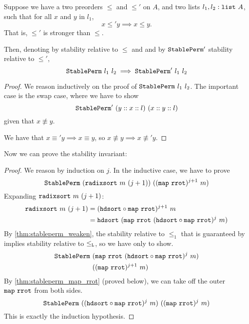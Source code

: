 \documentclass[sigplan,10pt,anonymous,review]{thesis}
\begin{document}
\begin{theorem}
  \label{thm:stableperm_weaken}
  Suppose we have a two preorders $\le$ and $\le'$ on $A$, and two lists
  $l_1,l_2 : \texttt{\textup{list}}~A$, such that for all $x$ and $y$ in $l_1$,
  \begin{equation*}
    x \le' y \implies x \le y.
  \end{equation*}
  That is, $\le'$ is stronger than $\le$.

  Then, denoting by  stability relative to $\le$ and and
  by $\texttt{\textup{StablePerm}}'$ stability relative to $\le'$,
  \begin{equation*}
    \texttt{\textup{StablePerm}}~l_1~l_2 \implies \texttt{\textup{StablePerm}}'~l_1~l_2
  \end{equation*}
\end{theorem}
\begin{proof}
  We reason inductively on the proof of $\texttt{\textup{StablePerm}}~l_1~l_2$.
  The important case is the swap case, where we have to show
  \begin{equation*}
    \texttt{\textup{StablePerm}}'~(y :: x :: l)~(x :: y :: l)
  \end{equation*}
  given that $x \not\equiv y$.

  We have that $x \equiv' y \implies x \equiv y$, so $x \not\equiv y \implies x
  \not\equiv' y$.
\end{proof}

Now we can prove the stability invariant:
\radixsortstableinv*
\begin{proof}
  We reason by induction on $j$. In the inductive case, we have to prove
  \begin{equation*}
    \texttt{\textup{StablePerm}}~(\texttt{\textup{radixsort}}~m~(j+1))~((\texttt{\textup{map}}~\texttt{\textup{rrot}})^{j+1}~m)
  \end{equation*}
  Expanding $\texttt{\textup{radixsort}}~m~(j+1)$:
  \begin{align*}
     \texttt{\textup{radixsort}}~m~(j+1)
    ={}& (\texttt{\textup{hdsort}} \circ \texttt{\textup{map}}~\texttt{\textup{rrot}})^{j+1}~m \\
    ={}& \texttt{\textup{hdsort}}~(\texttt{\textup{map}}~\texttt{\textup{rrot}}~(\texttt{\textup{hdsort}} \circ \texttt{\textup{map}}~\texttt{\textup{rrot}})^j~m)
  \end{align*}
  By \cref{thm:stableperm_weaken}, the stability relative to $\le_1$
  that is guaranteed by  implies stability relative to
  $\le_{\texttt{\textup{L}}}$, so we have only to show.
  \begin{align*}
    \texttt{\textup{StablePerm}}~&(\texttt{\textup{map}}~\texttt{\textup{rrot}}~(\texttt{\textup{hdsort}} \circ \texttt{\textup{map}}~\texttt{\textup{rrot}})^j~m) \\
                     &((\texttt{\textup{map}}~\texttt{\textup{rrot}})^{j+1}~m)
  \end{align*}
  By \cref{thm:stableperm_map_rrot} (proved below), we can take off
  the outer $\texttt{\textup{map}}~\texttt{\textup{rrot}}$ from both sides.
  \begin{equation*}
    \texttt{\textup{StablePerm}}~
    ((\texttt{\textup{hdsort}} \circ \texttt{\textup{map}}~\texttt{\textup{rrot}})^j~m)~((\texttt{\textup{map}}~\texttt{\textup{rrot}})^j~m)
  \end{equation*}
  This is exactly the induction hypothesis.
\end{proof}
\end{document}
